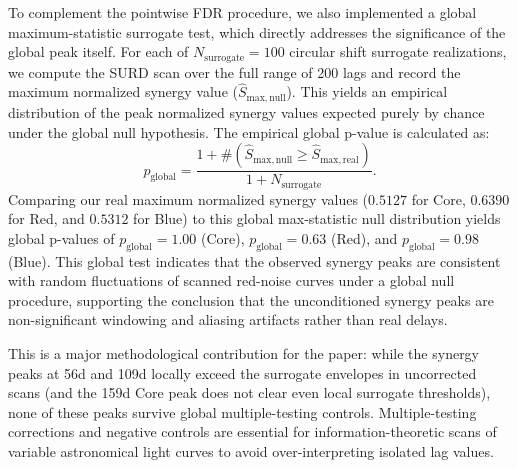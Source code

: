 \documentclass[fleqn,usenatbib]{mnras}
\begin{document}
To complement the pointwise FDR procedure, we also implemented a global maximum-statistic surrogate test, which directly addresses the significance of the global peak itself. For each of $N_{\mathrm{surrogate}} = 100$ circular shift surrogate realizations, we compute the SURD scan over the full range of 200 lags and record the maximum normalized synergy value ($\widehat{S}_{\mathrm{max, null}}$). This yields an empirical distribution of the peak normalized synergy values expected purely by chance under the global null hypothesis. The empirical global p-value is calculated as:
\begin{equation}
p_{\mathrm{global}} = \frac{1 + \#(\widehat{S}_{\mathrm{max, null}} \ge \widehat{S}_{\mathrm{max, real}})}{1 + N_{\mathrm{surrogate}}}.
\end{equation}
Comparing our real maximum normalized synergy values ($0.5127$ for Core, $0.6390$ for Red, and $0.5312$ for Blue) to this global max-statistic null distribution yields global p-values of $p_{\mathrm{global}} = 1.00$ (Core), $p_{\mathrm{global}} = 0.63$ (Red), and $p_{\mathrm{global}} = 0.98$ (Blue). This global test indicates that the observed synergy peaks are consistent with random fluctuations of scanned red-noise curves under a global null procedure, supporting the conclusion that the unconditioned synergy peaks are non-significant windowing and aliasing artifacts rather than real delays.

This is a major methodological contribution for the paper: while the synergy peaks at 56d and 109d locally exceed the surrogate envelopes in uncorrected scans (and the 159d Core peak does not clear even local surrogate thresholds), none of these peaks survive global multiple-testing controls. Multiple-testing corrections and negative controls are essential for information-theoretic scans of variable astronomical light curves to avoid over-interpreting isolated lag values.
\end{document}
